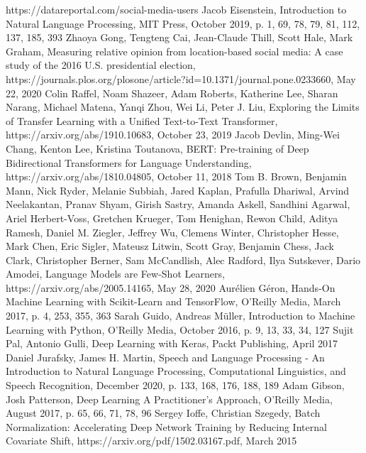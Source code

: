 \documentclass{article}
\begin{document}
\newpage\begin{thebibliography}{10}
  https://datareportal.com/social-media-users
  Jacob Eisenstein, Introduction to Natural Language Processing, MIT Press, October 2019, p. 1, 69, 78, 79, 81, 112, 137, 185, 393
  Zhaoya Gong, Tengteng Cai, Jean-Claude Thill, Scott Hale, Mark Graham, Measuring relative opinion from location-based social media: A case study of the 2016 U.S. presidential election, https://journals.plos.org/plosone/article?id=10.1371/journal.pone.0233660, May 22, 2020
  Colin Raffel, Noam Shazeer, Adam Roberts, Katherine Lee, Sharan Narang, Michael Matena, Yanqi Zhou, Wei Li, Peter J. Liu, Exploring the Limits of Transfer Learning with a Unified Text-to-Text Transformer, https://arxiv.org/abs/1910.10683, October 23, 2019
  Jacob Devlin, Ming-Wei Chang, Kenton Lee, Kristina Toutanova, BERT: Pre-training of Deep Bidirectional Transformers for Language Understanding, https://arxiv.org/abs/1810.04805, October 11, 2018
  Tom B. Brown, Benjamin Mann, Nick Ryder, Melanie Subbiah, Jared Kaplan, Prafulla Dhariwal, Arvind Neelakantan, Pranav Shyam, Girish Sastry, Amanda Askell, Sandhini Agarwal, Ariel Herbert-Voss, Gretchen Krueger, Tom Henighan, Rewon Child, Aditya Ramesh, Daniel M. Ziegler, Jeffrey Wu, Clemens Winter, Christopher Hesse, Mark Chen, Eric Sigler, Mateusz Litwin, Scott Gray, Benjamin Chess, Jack Clark, Christopher Berner, Sam McCandlish, Alec Radford, Ilya Sutskever, Dario Amodei, Language Models are Few-Shot Learners, https://arxiv.org/abs/2005.14165, May 28, 2020
  Aurélien Géron, Hands-On Machine Learning with Scikit-Learn and TensorFlow, O'Reilly Media, March 2017, p. 4, 253, 355, 363
  Sarah Guido, Andreas Müller, Introduction to Machine Learning with Python, O'Reilly Media, October 2016, p. 9, 13, 33, 34, 127
  Sujit Pal, Antonio Gulli, Deep Learning with Keras, Packt Publishing, April 2017
  Daniel Jurafsky, James H. Martin, Speech and Language Processing - An Introduction to Natural Language Processing, Computational Linguistics, and Speech Recognition, December 2020, p. 133, 168, 176, 188, 189
  Adam Gibson, Josh Patterson, Deep Learning A Practitioner's Approach, O'Reilly Media, August 2017, p. 65, 66, 71, 78, 96
  Sergey Ioffe, Christian Szegedy, Batch Normalization: Accelerating Deep Network Training by Reducing Internal Covariate Shift, https://arxiv.org/pdf/1502.03167.pdf, March 2015

\end{thebibliography}
\end{document}
